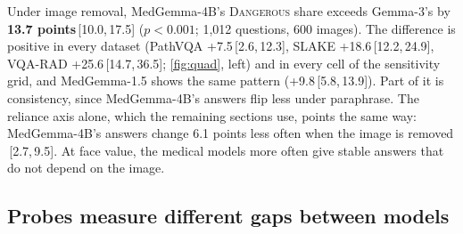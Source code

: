 \documentclass[10pt,twocolumn,letterpaper]{article}
\newcommand{\dang}{\textup{\textsc{Dangerous}}}
\newcommand{\ci}[2]{\,[#1,\,#2]}  %
\begin{document}
Under image removal, MedGemma-4B's \dang{} share exceeds Gemma-3's by \textbf{13.7 points}\ci{10.0}{17.5}
($p<0.001$; 1,012 questions, 600 images). The difference is positive in every dataset (PathVQA
+7.5\ci{2.6}{12.3}, SLAKE +18.6\ci{12.2}{24.9}, VQA-RAD +25.6\ci{14.7}{36.5}; \cref{fig:quad}, left) and in every
cell of the sensitivity grid, and MedGemma-1.5 shows the same pattern (+9.8\ci{5.8}{13.9}). Part of it is
consistency, since MedGemma-4B's answers flip less under paraphrase. The reliance axis alone, which the remaining
sections use, points the same way: MedGemma-4B's answers change 6.1 points less often when the image is removed
\ci{2.7}{9.5}. At face value, the medical models more often give stable answers that do not depend on the image.

\subsection{Probes measure different gaps between models}
\label{sec:disagree}
\end{document}
